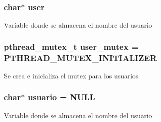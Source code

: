 \subsubsection[{\texorpdfstring{user}{user}}]{\setlength{\rightskip}{0pt plus 5cm}char$\ast$ user}\hypertarget{_g-2361-06-_p1-_server_8c_a14871705f45ccdc5bb9f4549efd8e119}{}\label{_g-2361-06-_p1-_server_8c_a14871705f45ccdc5bb9f4549efd8e119}
Variable donde se almacena el nombre del usuario 
\subsubsection[{\texorpdfstring{user\+\_\+mutex}{user_mutex}}]{\setlength{\rightskip}{0pt plus 5cm}pthread\+\_\+mutex\+\_\+t user\+\_\+mutex = P\+T\+H\+R\+E\+A\+D\+\_\+\+M\+U\+T\+E\+X\+\_\+\+I\+N\+I\+T\+I\+A\+L\+I\+Z\+ER}\hypertarget{_g-2361-06-_p1-_server_8c_a5dedd07a1144d2ab70b74a8e64b6a7c0}{}\label{_g-2361-06-_p1-_server_8c_a5dedd07a1144d2ab70b74a8e64b6a7c0}
Se crea e inicializa el mutex para los usuarios 
\subsubsection[{\texorpdfstring{usuario}{usuario}}]{\setlength{\rightskip}{0pt plus 5cm}char$\ast$ usuario = N\+U\+LL}\hypertarget{_g-2361-06-_p1-_server_8c_a0147a5b81499984f9cb00379a8cb84af}{}\label{_g-2361-06-_p1-_server_8c_a0147a5b81499984f9cb00379a8cb84af}
Variable donde se almacena el nombre del usuario 